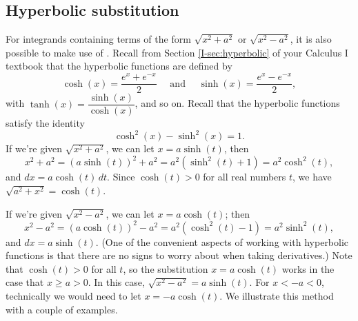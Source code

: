 \subsection*{Hyperbolic substitution}
For integrands containing terms of the form $\sqrt{x^2+a^2}$ or $\sqrt{x^2-a^2}$, it is also possible to make use of  . Recall from Section \ref{I-sec:hyperbolic} of your Calculus I textbook that the hyperbolic functions are defined by
\[
\cosh(x) = \frac{e^x+e^{-x}}{2} \quad \text{ and } \quad \sinh(x) = \frac{e^x-e^{-x}}{2},
\]
with $\tanh(x) = \dfrac{\sinh(x)}{\cosh(x)}$, and so on. Recall that the hyperbolic functions satisfy the identity
\[
\cosh^2(x)-\sinh^2(x)  = 1.
\]
If we're given $\sqrt{x^2+a^2}$, we can let $x=a\sinh(t)$, then
\[
x^2+a^2 = (a\sinh(t))^2+a^2 = a^2(\sinh^2(t)+1) = a^2\cosh^2(t),
\]
and $dx = a\cosh(t)\,dt$. Since $\cosh(t)>0$ for all real numbers $t$, we have $\sqrt{a^2+x^2}=\cosh(t)$.

If we're given $\sqrt{x^2-a^2}$, we can let $x=a\cosh(t)$; then
\[
x^2-a^2 = (a\cosh(t))^2-a^2 = a^2(\cosh^2(t)-1) = a^2\sinh^2(t),
\]
and $dx = a\sinh(t)$. (One of the convenient aspects of working with hyperbolic functions is that there are no signs to worry about when taking derivatives.)
Note that $\cosh(t)>0$ for all $t$, so the substitution $x=a\cosh(t)$ works in the case that $x\geq a>0$. In this case, $\sqrt{x^2-a^2} = a\sinh(t)$. For $x<-a<0$, technically we would need to let $x=-a\cosh(t)$. We illustrate this method with a couple of examples.\\

